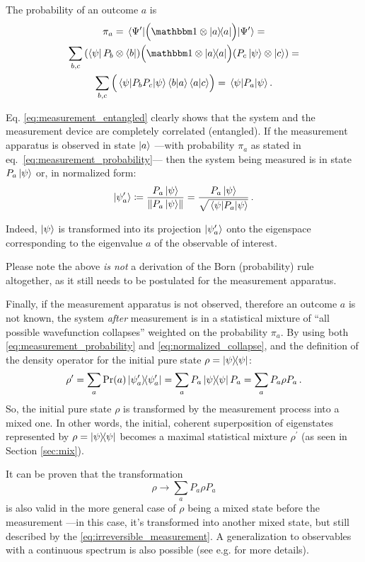 The probability of an outcome $a$ is
\begin{multline}\label{eq:measurement_probability}
  \pi_{a} = \expval{\qty\Big(\idop\ox\ketbra{a})}{\Psi^{\prime}} = \\
    \sum_{b,c}
      \qty(\bra{\psi}P_{b}\ox\bra{b})
      \qty\Big(\idop\ox\ketbra{a})
      \qty(P_{c}\ket{\psi}\ox\ket{c}) = \\
    \sum_{b,c}\qty\Big(\expval{P_bP_c}{\psi} \braket{b}{a} \braket{a}{c}) =
    \expval{P_a}{\psi} \text{.}
\end{multline}

Eq. \eqref{eq:measurement_entangled} clearly shows that the system
and the measurement device are completely correlated (entangled).
If the measurement apparatus is observed in state $\ket{a}$
---with probability $\pi_{a}$ as stated in eq.~\eqref{eq:measurement_probability}---
then the system being measured is in state $P_{a}\ket{\psi}$
or, in normalized form:
\begin{equation}\label{eq:normalized_collapse}
  \ket{\psi^\prime_a} \coloneqq \frac{P_{a}\ket{\psi}}{\norm{P_{a}\ket{\psi}}}
    = \frac{P_{a}\ket{\psi}}{\sqrt{\expval{P_a}{\psi}}} \,\text{.}
\end{equation}

Indeed,
$\ket{\psi}$
is transformed
into its projection $\ket{\psi^\prime_a}$
onto the eigenspace
corresponding to the eigenvalue $a$ of the observable of interest.

Please note the above \emph{is not} a derivation of the Born (probability) rule altogether,
as it still needs to be postulated for the measurement apparatus.

Finally, if the measurement apparatus is not observed,
therefore an outcome $a$ is not known,
the system \emph{after} measurement is in a statistical mixture
of ``all possible wavefunction collapses'' weighted on the probability $\pi_{a}$.
By using both \eqref{eq:measurement_probability} and \eqref{eq:normalized_collapse},
and the definition of the density operator for the initial pure state
$\rho = \ketbra{\psi}$:
\[
  \rho^{\prime} = \sum_a \Pr(a) \ketbra{\psi^{\prime}_a} = \sum_a P_a \ketbra{\psi} P_a
    = \sum_a P_a \rho P_a \,\text{.}
\]
So, the initial pure state $\rho$ is transformed by the measurement process into a mixed one.
In other words, the initial, coherent superposition of eigenstates represented by $\rho = \ketbra{\psi}$
becomes a maximal statistical mixture $\rho^{\prime}$
(as seen in Section \ref{sec:mix}).

It can be proven that the transformation
\begin{equation}\label{eq:irreversible_measurement}
  \rho \rightarrow \sum_a P_a \rho P_a
\end{equation}
is also valid in the more general case of $\rho$ being a mixed state before the measurement
---in this case, it's transformed into another mixed state,
but still described by the \eqref{eq:irreversible_measurement}.
A generalization to observables with a continuous spectrum is also possible
(see e.g. \cite[Section 3.1.1]{PreskillNotes} for more details).


